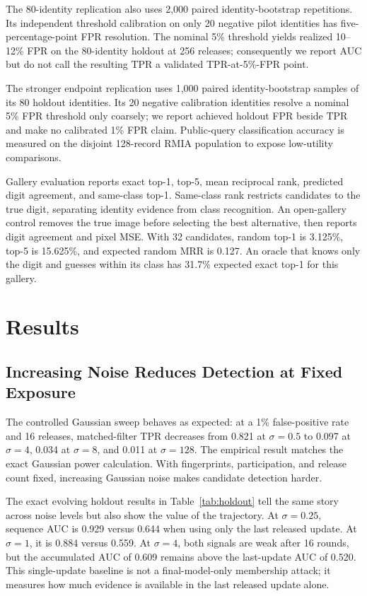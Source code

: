 \documentclass[conference]{IEEEtran}
\begin{document}
The 80-identity replication also uses 2,000 paired identity-bootstrap repetitions. Its independent threshold calibration on only 20 negative pilot identities has five-percentage-point FPR resolution. The nominal 5\% threshold yields realized 10--12\% FPR on the 80-identity holdout at 256 releases; consequently we report AUC but do not call the resulting TPR a validated TPR-at-5\%-FPR point.

The stronger endpoint replication uses 1,000 paired identity-bootstrap samples of its 80 holdout identities. Its 20 negative calibration identities resolve a nominal 5\% FPR threshold only coarsely; we report achieved holdout FPR beside TPR and make no calibrated 1\% FPR claim. Public-query classification accuracy is measured on the disjoint 128-record RMIA population to expose low-utility comparisons.

Gallery evaluation reports exact top-1, top-5, mean reciprocal rank, predicted digit agreement, and same-class top-1. Same-class rank restricts candidates to the true digit, separating identity evidence from class recognition. An open-gallery control removes the true image before selecting the best alternative, then reports digit agreement and pixel MSE. With 32 candidates, random top-1 is 3.125\%, top-5 is 15.625\%, and expected random MRR is 0.127. An oracle that knows only the digit and guesses within its class has 31.7\% expected exact top-1 for this gallery.

\section{Results}

\subsection{Increasing Noise Reduces Detection at Fixed Exposure}

The controlled Gaussian sweep behaves as expected: at a 1\% false-positive rate and 16 releases, matched-filter TPR decreases from 0.821 at $\sigma=0.5$ to 0.097 at $\sigma=4$, 0.034 at $\sigma=8$, and 0.011 at $\sigma=128$. The empirical result matches the exact Gaussian power calculation. With fingerprints, participation, and release count fixed, increasing Gaussian noise makes candidate detection harder.

The exact evolving holdout results in Table~\ref{tab:holdout} tell the same story across noise levels but also show the value of the trajectory. At $\sigma=0.25$, sequence AUC is 0.929 versus 0.644 when using only the last released update. At $\sigma=1$, it is 0.884 versus 0.559. At $\sigma=4$, both signals are weak after 16 rounds, but the accumulated AUC of 0.609 remains above the last-update AUC of 0.520. This single-update baseline is not a final-model-only membership attack; it measures how much evidence is available in the last released update alone.
\end{document}

